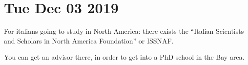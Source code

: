 \documentclass[main.tex]{subfiles}
\begin{document}
\section*{Tue Dec 03 2019}

For italians going to study in North America: there exists the ``Italian Scientists and Scholars in North America Foundation'' or ISSNAF. 

You can get an advisor there, in order to get into a PhD school in the Bay area. 
\end{document}
